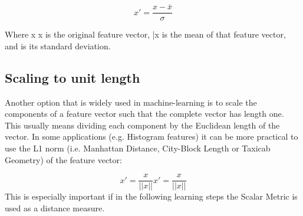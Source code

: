 \documentclass[11pt]{article} %
\begin{document}
\[x' = \frac{x - \bar{x}}{\sigma}\]

Where {\displaystyle x} x is the original feature vector, {} {\bar {x}} is the mean of that feature vector, and {\displaystyle \sigma } \sigma  is its standard deviation.

\subsection{Scaling to unit length}
Another option that is widely used in machine-learning is to scale the components of a feature vector such that the complete vector has length one. This usually means dividing each component by the Euclidean length of the vector. In some applications (e.g. Histogram features) it can be more practical to use the L1 norm (i.e. Manhattan Distance, City-Block Length or Taxicab Geometry) of the feature vector:

\[{\displaystyle x'={\frac {x}{||x||}}} x'={\frac  {x}{||x||}}\]
This is especially important if in the following learning steps the Scalar Metric is used as a distance measure.



	
\end{document}
